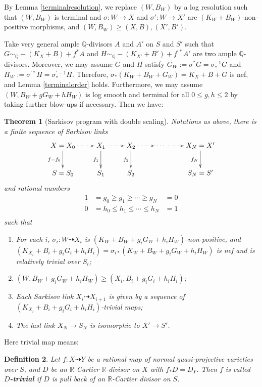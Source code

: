 \documentclass[11pt]{amsart}
\newtheorem{defn}{Definition}[section]
\newtheorem{thm}[defn]{Theorem}
\begin{document}
By Lemma \ref{terminalresolution}, we  replace $(W,B_W)$ by a log resolution such that $(W,B_{W})$ is terminal and $\sigma:W\to X$ and $\sigma':W\to X'$ are $(K_W+B_W)$-non-positive morphisms, and $(W,B_W)\geqslant (X,B),(X',B')$.

Take  very general ample $\mathbb{Q}$-divisors $ A $ and $ A' $ on $ S $ and $ S' $ such that $ G\sim_{\mathbb{Q}}-(K_X+B)+f^*A $ and $ H\sim_{\mathbb{Q}}-(K_{X'}+B')+f^{'*}A' $ are two ample $\mathbb{Q}$-divisors. Moreover, we may assume $ G $ and $ H $ satisfy $G_{W}:= \sigma^*G=\sigma^{-1}_*G $ and $ H_{W}:=\sigma^{'*}H=\sigma^{'-1}_*H $. Therefore, $\sigma_{*}(K_{W}+B_{W}+G_{W})=K_{X}+B+G$ is nef, and Lemma \ref{terminalorder} holds.
Furthermore, we may assume $(W, B_W+gG_W+hH_W)$ is log smooth and terminal for all $0\leqslant g,h\leqslant 2$ by taking further blow-ups if necessary.
Then we have:
\begin{thm}[Sarkisov program with double scaling]\label{main2}
  \cite[Claim 13.12]{haconMinimalModelProgram2012}
  Notations as above, there is a finite sequence of Sarkisov links
  \[
    \xymatrix{
    X=X_0\ar@{.>}[r]\ar[d]_{f=f_{0}}&X_{1}\ar@{.>}[r]\ar[d]_{f_{1}}& X_{2}\ar[d]_{f_{2}}\ar@{.>}[r] &\cdots\ar@{.>}[r]&X_N=X'\ar[d]_{f_{N}} \\
    S=S_{0}&S_{1} &S_{2}&&S_N=S'
    }
  \]
  and rational numbers
  \[
    \begin{aligned}
      1 & =g_0\geqslant g_1 \geqslant \cdots \geqslant g_N   & =0 \\
      0 & =h_0\leqslant h_{1} \leqslant \cdots \leqslant h_N & =1 \\
    \end{aligned}
  \]
  such that
  \begin{enumerate}
    \item For each $i$, $\sigma_i:W\dashrightarrow  X_{i}$ is $(K_{W}+B_{W}+g_{i}G_{W}+h_{i}H_{W})$-non-positive, and $(K_{X_{i}}+B_{i}+g_{i}G_{i}+h_{i}H_{i})=\sigma_{i*}(K_{W}+B_{W}+g_{i}G_{W}+h_{i}H_{W})$ is nef and is relatively trivial over $S_{i}$;
    \item $(W,B_{W}+g_{i}G_{W}+h_{i}H_{W})\geqslant (X_{i},B_{i}+g_{i}G_{i}+h_{i}H_{i})$;
    \item Each Sarkisov link $X_{i}\dashrightarrow X_{i+1}$ is given by a sequence of $(K_{X_{i}}+B_{i}+g_{i}G_{i}+h_{i}H_{i})$-trivial maps;
    \item  The last link $X_{N} \to S_{N}$ is isomorphic to $X'\to S'$.
  \end{enumerate}
\end{thm}
Here trivial map means:
\begin{defn}\label{trivialmap}
  \cite[\S 13.2]{haconMinimalModelProgram2012} Let $f:X\dashrightarrow Y$ be a rational map of normal quasi-projective varieties over $S$, and $D$ be an $\mathbb{R}$-Cartier $\mathbb{R}$-divisor  on $X$ with $f_*D=D_Y$. Then $f$ is called \textbf{$D$-trivial} if $D$ is pull back of an $\mathbb{R}$-Cartier divisor on $S$.
\end{defn}
\end{document}
